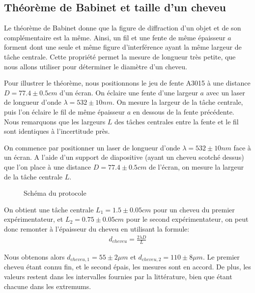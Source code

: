 \documentclass[12pt]{article}
\begin{document}
\subsection{Théorème de Babinet et taille d'un cheveu}
Le théorème de Babinet donne que la figure de diffraction d'un objet et de son complémentaire est la même.
Ainsi, un fil et une fente de même épaisseur $a$ forment dont une seule et même figure d'interférence ayant la même largeur de tâche centrale. Cette propriété permet la mesure de longueur très petite, que nous allons utiliser
pour déterminer le diamètre d'un cheveu.

Pour illustrer le théorème, nous positionnons le jeu de fente A3015 à une distance $D = 77.4 \pm 0.5 cm$ d'un écran. 
On éclaire une fente d'une largeur $a$ avec un laser de longueur d'onde $\lambda = 532 \pm 10nm$. On mesure la largeur de la tâche centrale, puis l'on éclaire le fil de même épaisseur $a$ en dessous de la fente précédente.
Nous remarquons que les largeurs $L$ des tâches centrales entre la fente et le fil sont identiques à l'incertitude près.

On commence par positionner un laser de longueur d'onde $\lambda = 532 \pm 10 nm$ face à un écran. A l'aide d'un support de diapositive (ayant un cheveu scotché dessus) que l'on place à une distance $D = 77.4 \pm 0.5 cm$ de
l'écran, on mesure la largeur de la tâche centrale $L$. 

\begin{figure}[!h]
    \begin{center}
        \resizebox{0.6\textwidth}{8cm}{
        
        }
    \end{center}
    \caption{Schéma du protocole}
\end{figure}

On obtient une tâche centrale $L_1 = 1.5 \pm 0.05cm$ pour un cheveu du premier expérimentateur, et $L_2 = 0.75 \pm 0.05cm$ pour le second expérimentateur, on peut donc remonter à l'épaisseur du cheveu en utilisant la formule:
\begin{align}
    d_{cheveu} = \frac{2 \lambda D}{L}
\end{align}

Nous obtenons alors $d_{cheveu,1} = 55 \pm 2 \mu m$ et $d_{cheveu,2} = 110 \pm 8 \mu m$. Le premier cheveu étant connu fin, et le second épais, les mesures sont en accord. De plus, les valeurs restent dans les intervalles
fournies par la littérature, bien que étant chacune dans les extremums.

\newpage
\end{document}
